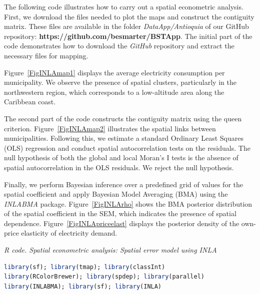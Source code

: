 The following code illustrates how to carry out a spatial econometric analysis. First, we download the files needed to plot the maps and construct the contiguity matrix. These files are available in the folder \textit{DataApp/Antioquia} of our GitHub repository: \textbf{https://github.com/besmarter/BSTApp}. The initial part of the code demonstrates how to download the \textit{GitHub} repository and extract the necessary files for mapping.

Figure~\ref{FigINLAmap1} displays the average electricity consumption per municipality. We observe the presence of spatial clusters, particularly in the northwestern region, which corresponds to a low-altitude area along the Caribbean coast.

The second part of the code constructs the contiguity matrix using the queen criterion. Figure~\ref{FigINLAmap2} illustrates the spatial links between municipalities. Following this, we estimate a standard Ordinary Least Squares (OLS) regression and conduct spatial autocorrelation tests on the residuals. The null hypothesis of both the global and local Moran's I tests is the absence of spatial autocorrelation in the OLS residuals. We reject the null hypothesis.

Finally, we perform Bayesian inference over a predefined grid of values for the spatial coefficient and apply Bayesian Model Averaging (BMA) using the \textit{INLABMA} package. Figure~\ref{FigINLArho} shows the BMA posterior distribution of the spatial coefficient in the SEM, which indicates the presence of spatial dependence. Figure~\ref{FigINLApriceelast} displays the posterior density of the own-price elasticity of electricity demand.
   
\begin{tcolorbox}[enhanced,width=4.67in,center upper,
	fontupper=\large\bfseries,drop shadow southwest,sharp corners]
	\textit{R code. Spatial econometric analysis: Spatial error model using INLA}
	\begin{VF}
		\begin{lstlisting}[language=R]
library(sf); library(tmap); library(classInt)
library(RColorBrewer); library(spdep); library(parallel)
library(INLABMA); library(sf); library(INLA)
\end{lstlisting}
	\end{VF}
\end{tcolorbox}

